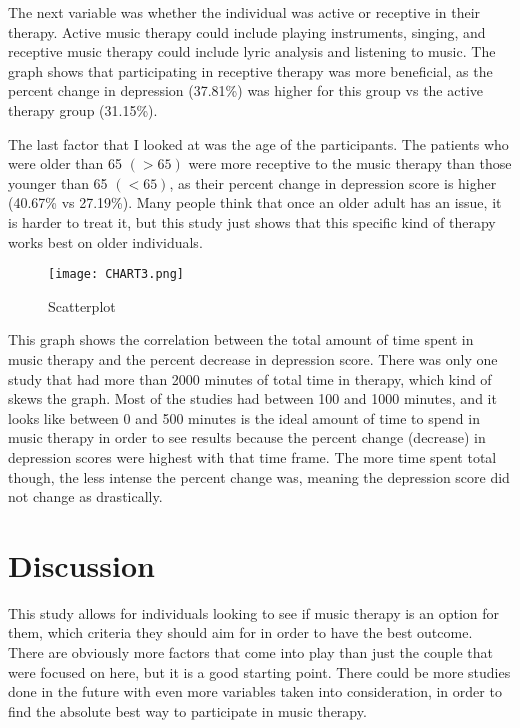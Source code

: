 \documentclass[12pt]{article}
\begin{document}
 The next variable was whether the individual was active or receptive in their therapy. Active music therapy could include playing instruments, singing, and receptive music therapy could include lyric analysis and listening to music. The graph shows that participating in receptive therapy was more beneficial, as the percent change in depression (37.81\%) was higher  for this group vs the active therapy group (31.15\%). 
 
 The last factor that I looked at was the age of the participants. The patients who were older than 65 $(>65)$ were more receptive to the music therapy than those younger than 65 $(<65)$, as their percent change in depression score is higher (40.67\% vs 27.19\%). Many people think that once an older adult has an issue, it is harder to treat it, but this study just shows that this specific kind of therapy works best on older individuals.

 \newpage
 
 \begin{figure}[hbt!]
   \centering
   \texttt{[image: CHART3.png]}
   \label{fig:chart3}
   \caption{Scatterplot}
 \end{figure}

 This graph shows the correlation between the total amount of time spent in music therapy and the percent decrease in depression score. There was only one study that had more than 2000 minutes of total time in therapy, which kind of skews the graph. Most of the studies had between 100 and 1000 minutes, and it looks like between 0 and 500 minutes is the ideal amount of time to spend in music therapy in order to see results because the percent change (decrease) in depression scores were highest with that time frame. The more time spent total though, the less intense the percent change was, meaning the depression score did not change as drastically. 

 \section{Discussion} 
 \label{sec:discussion}

 This study allows for individuals looking to see if music therapy is an option for them, which criteria they should aim for in order to have the best outcome. There are obviously more factors that come into play than just the couple that were focused on here, but it is a good starting point. There could be more studies done in the future with even more variables taken into consideration, in order to find the absolute best way to participate in music therapy.

 \newpage

 
 {}
\end{document}
